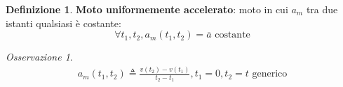 \documentclass[a4paper, 12pt]{report}
\theoremstyle{definition}
\newtheorem{definition}{Definizione}[section]
\theoremstyle{remark}
\newtheorem*{remark}{Osservazione}
\theoremstyle{plain}
\begin{document}
\begin{definition}
    {\bf Moto uniformemente accelerato}: moto in cui $a_m$ tra due istanti qualsiasi è costante:
    \begin{equation}
        \forall t_1, t_2, a_m(t_1, t_2) = \overline{a} \mbox{ costante}
    \end{equation}
\end{definition}

\begin{remark}
    \begin{gather}
        \nonumber a_m(t_1, t_2) \triangleq \frac{v(t_2) - v(t_1)}{t_2 - t_1}, t_1 = 0, t_2 = t \mbox{ generico}\\
    \end{gather}
\end{remark}
\end{document}
